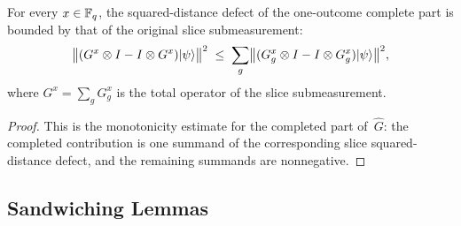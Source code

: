 \begin{lemma}\label{lem:q-sdd-complete-part-slice-bound}
	\leanok
	For every $x \in \mathbb{F}_q$, the squared-distance defect of the one-outcome
	complete part is bounded by that of the original slice submeasurement:
	\[
		\bigl\|
		(G^x \otimes I - I \otimes G^x)\lvert \psi \rangle
		\bigr\|^2
		\;\le\;
		\sum_g
		\bigl\|
		(G^x_g \otimes I - I \otimes G^x_g)\lvert \psi \rangle
		\bigr\|^2,
	\]
	where $G^x = \sum_g G^x_g$ is the total operator of the slice
	submeasurement.
\end{lemma}
\begin{proof}
	\leanok
	This is the monotonicity estimate for the completed part of~$\widehat G$:
	the completed contribution is one summand of the corresponding slice
	squared-distance defect, and the remaining summands are nonnegative.
\end{proof}

\subsection{Sandwiching Lemmas}
\label{sec:ld-sandwiching}

